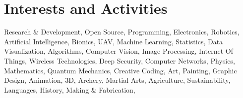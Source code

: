 \section{Interests and Activities} Research \& Development, Open Source, Programming, Electronics, Robotics, Artificial Intelligence, Bionics, UAV, Machine Learning, Statistics, Data Visualization, Algorithms, Computer Vision, Image Processing, Internet Of Things, Wireless Technologies, Deep Security, Computer Networks, Physics, Mathematics, Quantum Mechanics, Creative Coding, Art, Painting, Graphic Design, Animation, 3D, Archery, Martial Arts, Agriculture, Sustainability, Languages, History, Making \& Fabrication, 




